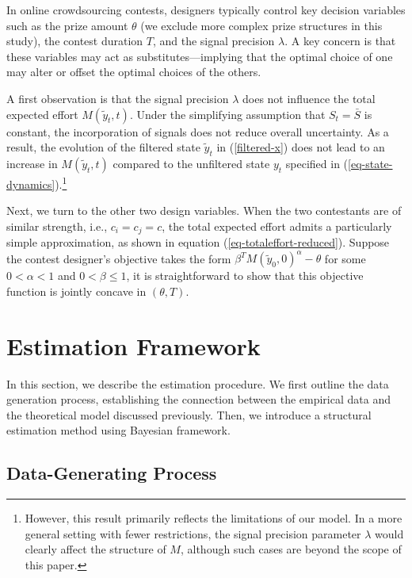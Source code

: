 \documentclass[mnsc]{informs3}
\begin{document}
In online crowdsourcing contests, designers typically control key decision variables such as the prize amount $\theta$ (we exclude more complex prize structures in this study), the contest duration $T$, and the signal precision $\lambda$. 
A key concern is that these variables may act as substitutes—implying that the optimal choice of one may alter or offset the optimal choices of the others.

A first observation is that the signal precision $\lambda$ does not influence the total expected effort $M(\tilde{y}_t, t)$.
Under the simplifying assumption that $S_t = \bar{S}$ is constant, the incorporation of signals does not reduce overall uncertainty.
As a result, the evolution of the filtered state $\tilde{y}_t$ in (\ref{filtered-x}) does not lead to an increase in $M(\tilde{y}_t, t)$ compared to the unfiltered state $y_t$ specified in (\ref{eq-state-dynamics}).\footnote{
However, this result primarily reflects the limitations of our model.
In a more general setting with fewer restrictions, the signal precision parameter $\lambda$ would clearly affect the structure of $M$,
although such cases are beyond the scope of this paper.
}

Next, we turn to the other two design variables.
When the two contestants are of similar strength, i.e., $c_i = c_j = c$, the total expected effort admits a particularly simple approximation, as shown in equation (\ref{eq-totaleffort-reduced}).
Suppose the contest designer’s objective takes the form $\beta^{T}M(\tilde{y}_0, 0)^\alpha - \theta$ for some $0 < \alpha < 1$ and $0 < \beta \le 1$,
it is straightforward to show that this objective function is jointly concave in $(\theta, T)$.




\section{Estimation Framework}\label{sect-bayes-framework}

In this section, we describe the estimation procedure. 
We first outline the data generation process, establishing the connection between the empirical data and the theoretical model discussed previously.
Then, we introduce a structural estimation method using Bayesian framework.

\subsection{Data-Generating Process}
\end{document}

